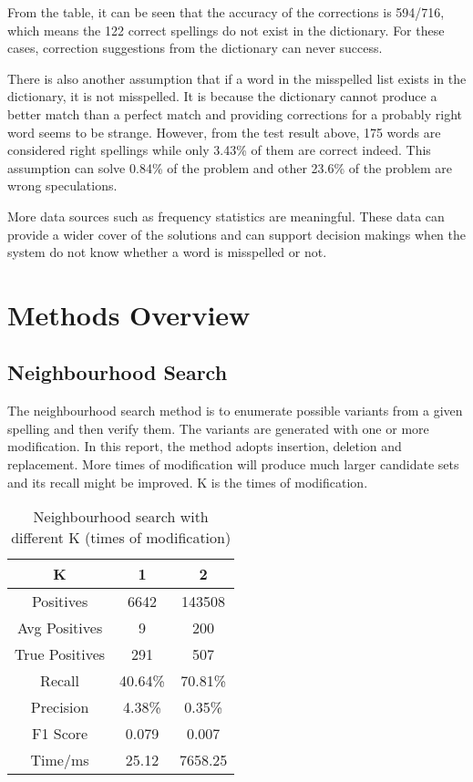 \documentclass[11pt]{article}
\begin{document}
From the table, it can be seen that the accuracy of the corrections is 594/716, which means the 122 correct spellings do not exist in the dictionary. For these cases, correction suggestions from the dictionary can never success. 

There is also another assumption that if a word in the misspelled list exists in the dictionary, it is not misspelled. It is because the dictionary cannot produce a better match than a perfect match and providing corrections for a probably right word seems to be strange. However, from the test result above, 175 words are considered right spellings while only 3.43\% of them are correct indeed. This assumption can solve 0.84\% of the problem and other 23.6\% of the problem are wrong speculations.

More data sources such as frequency statistics are meaningful. These data can provide a wider cover of the solutions and can support decision makings when the system do not know whether a word is misspelled or not. 

\section{Methods Overview}

\subsection{Neighbourhood Search}
The neighbourhood search method is to enumerate possible variants from a given spelling and then verify them. The variants are generated with one or more modification. In this report, the method adopts insertion, deletion and replacement. More times of modification will produce much larger candidate sets and its recall might be improved. K is the times of modification.

\begin{table}[h]
 \begin{center}
\begin{tabular}{ |c||c|c| }
      \hline
      K & 1 & 2 \\
      \hline
      Positives & 6642 & 143508\\
      Avg Positives & 9 & 200\\
      True Positives & 291 & 507\\
      Recall & 40.64\% & 70.81\%\\
      Precision & 4.38\% & 0.35\%\\
      F1 Score & 0.079 & 0.007\\
      Time/ms & 25.12& 7658.25\\
      \hline
\end{tabular}
\caption{Neighbourhood search with different K (times of modification)}\label{table2}
 \end{center}
\end{table}
\end{document}
